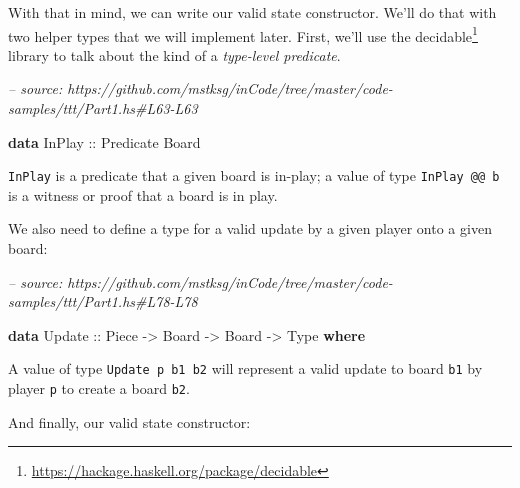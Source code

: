 \documentclass[]{article}
\newenvironment{Shaded}{}{}
\newcommand{\CommentTok}[1]{\textcolor[rgb]{0.38,0.63,0.69}{\textit{#1}}}
\newcommand{\DataTypeTok}[1]{\textcolor[rgb]{0.56,0.13,0.00}{#1}}
\newcommand{\KeywordTok}[1]{\textcolor[rgb]{0.00,0.44,0.13}{\textbf{#1}}}
\newcommand{\OtherTok}[1]{\textcolor[rgb]{0.00,0.44,0.13}{#1}}
\renewcommand{\href}[2]{#2\footnote{\url{#1}}}
\begin{document}
With that in mind, we can write our valid state constructor. We'll do that with
two helper types that we will implement later. First, we'll use the
\href{https://hackage.haskell.org/package/decidable}{decidable} library to talk
about the kind of a \emph{type-level predicate}.

\begin{Shaded}
\begin{Highlighting}[]
\CommentTok{-- source: https://github.com/mstksg/inCode/tree/master/code-samples/ttt/Part1.hs#L63-L63}

\KeywordTok{data} \DataTypeTok{InPlay}\OtherTok{ ::} \DataTypeTok{Predicate} \DataTypeTok{Board}
\end{Highlighting}
\end{Shaded}

\texttt{InPlay} is a predicate that a given board is in-play; a value of type
\texttt{InPlay\ @@\ b} is a witness or proof that a board is in play.

We also need to define a type for a valid update by a given player onto a given
board:

\begin{Shaded}
\begin{Highlighting}[]
\CommentTok{-- source: https://github.com/mstksg/inCode/tree/master/code-samples/ttt/Part1.hs#L78-L78}

\KeywordTok{data} \DataTypeTok{Update}\OtherTok{ ::} \DataTypeTok{Piece} \OtherTok{->} \DataTypeTok{Board} \OtherTok{->} \DataTypeTok{Board} \OtherTok{->} \DataTypeTok{Type} \KeywordTok{where}
\end{Highlighting}
\end{Shaded}

A value of type \texttt{Update\ p\ b1\ b2} will represent a valid update to
board \texttt{b1} by player \texttt{p} to create a board \texttt{b2}.

And finally, our valid state constructor:
\end{document}
